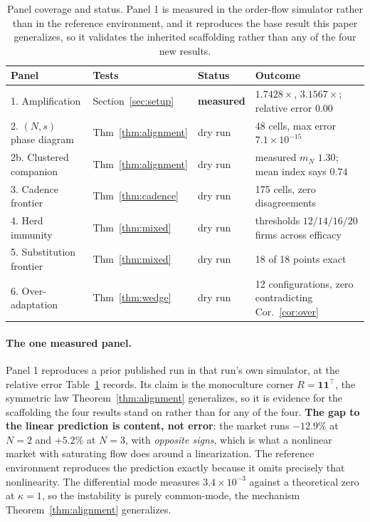 \documentclass{article}
\theoremstyle{plain}
\theoremstyle{definition}
\newcommand{\mN}{m_N}
\begin{document}
\begin{table}[t]
\centering
\caption{Panel coverage and status. Panel 1 is measured in the order-flow simulator rather than in the reference environment, and it reproduces the base result this paper generalizes, so it validates the inherited scaffolding rather than any of the four new results.}
\label{tab:panels}
\small
\begin{tabular}{llll}
\toprule
Panel & Tests & Status & Outcome \\
\midrule
1. Amplification & Section~\ref{sec:setup} & \textbf{measured} & $1.7428\times$, $3.1567\times$; relative error $0.00$ \\
2. $(N,s)$ phase diagram & Thm~\ref{thm:alignment} & dry run & 48 cells, max error $7.1\times 10^{-15}$ \\
2b. Clustered companion & Thm~\ref{thm:alignment} & dry run & measured $\mN$ $1.30$; mean index says $0.74$ \\
3. Cadence frontier & Thm~\ref{thm:cadence} & dry run & 175 cells, zero disagreements \\
4. Herd immunity & Thm~\ref{thm:mixed} & dry run & thresholds $12/14/16/20$ firms across efficacy \\
5. Substitution frontier & Thm~\ref{thm:mixed} & dry run & 18 of 18 points exact \\
6. Over-adaptation & Thm~\ref{thm:wedge} & dry run & 12 configurations, zero contradicting Cor.~\ref{cor:over} \\
\bottomrule
\end{tabular}
\end{table}

\paragraph{The one measured panel.}
Panel 1 reproduces a prior published run in that run's own simulator, at the relative error Table~\ref{tab:panels} records. Its claim is the monoculture corner $R = \mathbf{1}\mathbf{1}^{\top}$, the symmetric law Theorem~\ref{thm:alignment} generalizes, so it is evidence for the scaffolding the four results stand on rather than for any of the four. \textbf{The gap to the linear prediction is content, not error}: the market runs $-12.9\%$ at $N=2$ and $+5.2\%$ at $N=3$, with \emph{opposite signs}, which is what a nonlinear market with saturating flow does around a linearization. The reference environment reproduces the prediction exactly because it omits precisely that nonlinearity. The differential mode measures $3.4\times 10^{-3}$ against a theoretical zero at $\kappa=1$, so the instability is purely common-mode, the mechanism Theorem~\ref{thm:alignment} generalizes.
\end{document}
